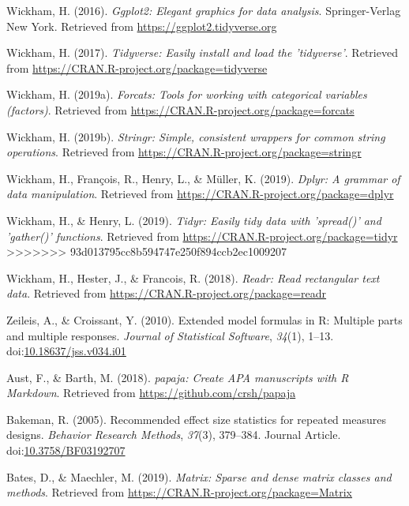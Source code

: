 \documentclass[
  man]{apa6}
\begin{document}
\leavevmode\hypertarget{ref-R-ggplot2}{}%
Wickham, H. (2016). \emph{Ggplot2: Elegant graphics for data analysis}. Springer-Verlag New York. Retrieved from \url{https://ggplot2.tidyverse.org}

\leavevmode\hypertarget{ref-R-tidyverse}{}%
Wickham, H. (2017). \emph{Tidyverse: Easily install and load the 'tidyverse'}. Retrieved from \url{https://CRAN.R-project.org/package=tidyverse}

\leavevmode\hypertarget{ref-R-forcats}{}%
Wickham, H. (2019a). \emph{Forcats: Tools for working with categorical variables (factors)}. Retrieved from \url{https://CRAN.R-project.org/package=forcats}

\leavevmode\hypertarget{ref-R-stringr}{}%
Wickham, H. (2019b). \emph{Stringr: Simple, consistent wrappers for common string operations}. Retrieved from \url{https://CRAN.R-project.org/package=stringr}

\leavevmode\hypertarget{ref-R-dplyr}{}%
Wickham, H., François, R., Henry, L., \& Müller, K. (2019). \emph{Dplyr: A grammar of data manipulation}. Retrieved from \url{https://CRAN.R-project.org/package=dplyr}

\leavevmode\hypertarget{ref-R-tidyr}{}%
Wickham, H., \& Henry, L. (2019). \emph{Tidyr: Easily tidy data with 'spread()' and 'gather()' functions}. Retrieved from \url{https://CRAN.R-project.org/package=tidyr}
>>>>>>> 93d013795cc8b594747e250f894ccb2ec1009207

\leavevmode\hypertarget{ref-R-readr}{}%
Wickham, H., Hester, J., \& Francois, R. (2018). \emph{Readr: Read rectangular text data}. Retrieved from \url{https://CRAN.R-project.org/package=readr}

\leavevmode\hypertarget{ref-R-Formula}{}%
Zeileis, A., \& Croissant, Y. (2010). Extended model formulas in R: Multiple parts and multiple responses. \emph{Journal of Statistical Software}, \emph{34}(1), 1--13. doi:\href{https://doi.org/10.18637/jss.v034.i01}{10.18637/jss.v034.i01}

\leavevmode\hypertarget{ref-R-papaja}{}%
Aust, F., \& Barth, M. (2018). \emph{papaja: Create APA manuscripts with R Markdown}. Retrieved from \url{https://github.com/crsh/papaja}

\leavevmode\hypertarget{ref-Bakeman_2015_eff_size}{}%
Bakeman, R. (2005). Recommended effect size statistics for repeated measures designs. \emph{Behavior Research Methods}, \emph{37}(3), 379--384. Journal Article. doi:\href{https://doi.org/10.3758/BF03192707}{10.3758/BF03192707}

\leavevmode\hypertarget{ref-R-Matrix}{}%
Bates, D., \& Maechler, M. (2019). \emph{Matrix: Sparse and dense matrix classes and methods}. Retrieved from \url{https://CRAN.R-project.org/package=Matrix}
\end{document}

